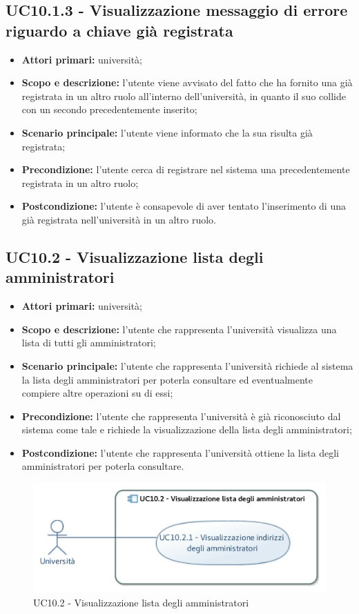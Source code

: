 \documentclass[AnalisiDeiRequisiti.tex]{subfiles}
\begin{document}
\subsection{UC10.1.3 - Visualizzazione messaggio di errore riguardo a chiave già registrata}
\begin{itemize}
	\item \textbf{Attori primari:} università;
	\item \textbf{Scopo e descrizione:} l'utente viene avvisato del fatto che ha fornito una  già registrata in un altro ruolo all'interno dell'università, in quanto il suo  collide con un secondo precedentemente inserito;
	\item \textbf{Scenario principale:} l'utente viene informato che la sua  risulta già registrata;
	\item \textbf{Precondizione:} l'utente cerca di registrare nel sistema una  precedentemente registrata in un altro ruolo;
	\item \textbf{Postcondizione:} l'utente è consapevole di aver tentato l'inserimento di una  già registrata nell'università in un altro ruolo.
\end{itemize}


\subsection{UC10.2 - Visualizzazione lista degli amministratori}
\begin{itemize}
	\item \textbf{Attori primari:} università;
	\item \textbf{Scopo e descrizione:} l'utente che rappresenta l'università visualizza una lista di tutti gli amministratori;
	\item \textbf{Scenario principale:} l'utente che rappresenta l'università richiede al sistema la lista degli amministratori per poterla consultare ed eventualmente compiere altre operazioni su di essi;
	\item \textbf{Precondizione:} l'utente che rappresenta l'università è già riconosciuto dal sistema come tale e richiede la visualizzazione della lista degli amministratori;
	\item \textbf{Postcondizione:} l'utente che rappresenta l'università ottiene la lista degli amministratori per poterla consultare.
\end{itemize}

\begin{figure}[H]
	\centering
	\includegraphics[width=0.7\linewidth]{UC10_2.jpg}
	\caption{UC10.2 - Visualizzazione lista degli amministratori}
	\label{UC10.2 - Visualizzazione lista degli amministratori}
\end{figure}
\end{document}
